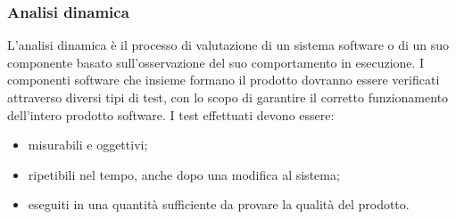 \subsubsection{Analisi dinamica}
L’analisi dinamica è il processo di valutazione di un sistema software o di un suo componente basato sull’osservazione del suo comportamento in esecuzione.
I componenti software che insieme formano il prodotto dovranno essere verificati attraverso diversi tipi di test, con lo scopo di garantire il corretto funzionamento dell'intero prodotto software.
I test effettuati devono essere:
\begin{itemize}
\item misurabili e oggettivi;
\item ripetibili nel tempo, anche dopo una modifica al sistema;
\item eseguiti in una quantità sufficiente da provare la qualità del prodotto.
\end{itemize} 